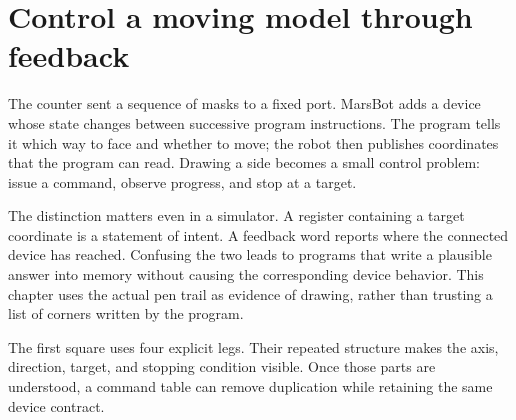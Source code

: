 \section{Control a moving model through
  feedback}\label{006-marsbot-square-p00-control-a-moving-model-through-feedback}

The counter sent a sequence of masks to a fixed port. MarsBot adds a
device whose state changes between successive program instructions. The
program tells it which way to face and whether to move; the robot then
publishes coordinates that the program can read. Drawing a side becomes
a small control problem: issue a command, observe progress, and stop at
a target.

The distinction matters even in a simulator. A register containing a
target coordinate is a statement of intent. A feedback word reports
where the connected device has reached. Confusing the two leads to
programs that write a plausible answer into memory without causing the
corresponding device behavior. This chapter uses the actual pen trail as
evidence of drawing, rather than trusting a list of corners written by
the program.

The first square uses four explicit legs. Their repeated structure makes
the axis, direction, target, and stopping condition visible. Once those
parts are understood, a command table can remove duplication while
retaining the same device contract.
